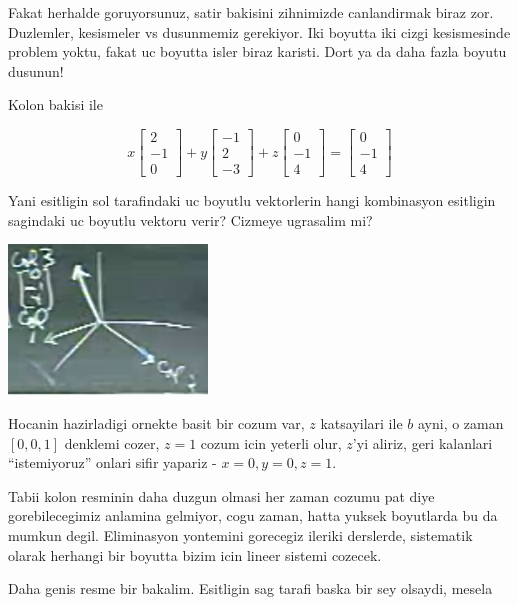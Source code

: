 \documentclass[12pt,fleqn]{article}\usepackage{../common}
\begin{document}
Fakat herhalde goruyorsunuz, satir bakisini zihnimizde canlandirmak biraz
zor. Duzlemler, kesismeler vs dusunmemiz gerekiyor. Iki boyutta iki cizgi
kesismesinde problem yoktu, fakat uc boyutta isler biraz karisti. Dort ya
da daha fazla boyutu dusunun! 

Kolon bakisi ile

$$ 
x 
\left[\begin{array}{r}
2 \\
-1 \\
0
\end{array}\right]
+
y
\left[\begin{array}{r}
-1 \\
2 \\
-3
\end{array}\right]
+
z 
\left[\begin{array}{r}
0 \\
-1 \\
4
\end{array}\right]
=
\left[\begin{array}{r}
0 \\
-1 \\
4
\end{array}\right]
 $$

Yani esitligin sol tarafindaki uc boyutlu vektorlerin hangi kombinasyon
esitligin sagindaki uc boyutlu vektoru verir? Cizmeye ugrasalim mi? 

\includegraphics[height=4cm]{1_08.png}

Hocanin hazirladigi ornekte basit bir cozum var, $z$ katsayilari ile $b$
ayni, o zaman $[0,0,1]$ denklemi cozer, $z=1$ cozum icin yeterli olur,
$z$'yi aliriz, geri kalanlari ``istemiyoruz'' onlari sifir yapariz -
$x=0,y=0,z=1$.

Tabii kolon resminin daha duzgun olmasi her zaman cozumu pat diye
gorebilecegimiz anlamina gelmiyor, cogu zaman, hatta yuksek boyutlarda bu
da mumkun degil. Eliminasyon yontemini gorecegiz ileriki derslerde,
sistematik olarak herhangi bir boyutta bizim icin lineer sistemi cozecek. 

Daha genis resme bir bakalim. Esitligin sag tarafi baska bir sey olsaydi,
mesela
\end{document}
